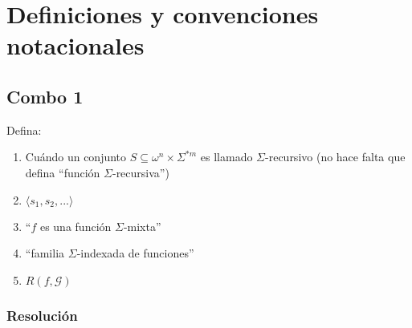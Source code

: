 \documentclass[
]{article}
\author{}
\date{}
\providecommand{\tightlist}{%
  \setlength{\itemsep}{0pt}\setlength{\parskip}{0pt}}
\begin{document}
\section{Definiciones y convenciones
notacionales}\label{definiciones-y-convenciones-notacionales}

\subsection{Combo 1}\label{combo-1}

Defina:

\begin{enumerate}
\def\labelenumi{\arabic{enumi}.}
\tightlist
\item
  Cuándo un conjunto \(S\subseteq\omega^n\times\Sigma^{*m}\) es llamado
  \(\Sigma\)-recursivo (no hace falta que defina ``función
  \(\Sigma\)-recursiva'')
\item
  \(\langle s_1,s_2,...\rangle\)
\item
  ``\(f\) es una función \(\Sigma\)-mixta''
\item
  ``familia \(\Sigma\)-indexada de funciones''
\item
  \(R(f,\mathcal{G})\)
\end{enumerate}

\subsubsection{Resolución}\label{resoluciuxf3n}
\end{document}
